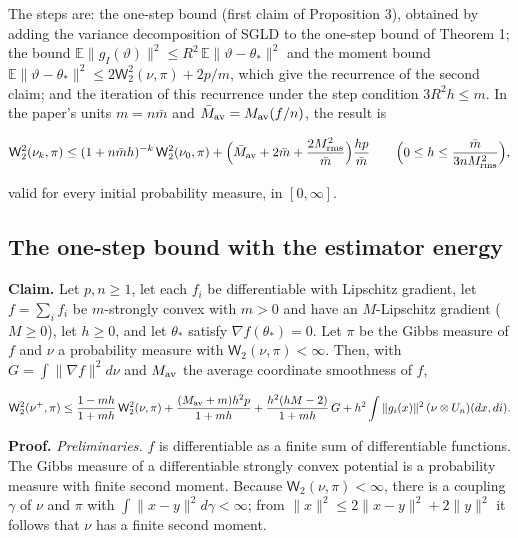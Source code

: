 \documentclass[11pt,a4paper]{report}
\begin{document}
The steps are: the one-step bound (first claim of Proposition 3), obtained by adding the variance decomposition of SGLD to the one-step bound of Theorem 1; the bound \(\mathbb E\|g_I(\vartheta)\|^2\le R^2\,\mathbb E\|\vartheta-\theta_*\|^2\) and the moment bound \(\mathbb E\|\vartheta-\theta_*\|^2\le2\mathsf W_2^2(\nu,\pi)+2p/m\), which give the recurrence of the second claim; and the iteration of this recurrence under the step condition \(3R^2h\le m\). In the paper's units \(m=n\bar m\) and \(\bar M_{\rm av}=M_{\rm av}(f/n)\), the result is


\[\mathsf W_2^2(\nu_k,\pi)\le(1+n\bar mh)^{-k}\,\mathsf W_2^2(\nu_0,\pi)+\Bigl(\bar M_{\rm av}+2\bar m+\frac{2M_{\rm rms}^2}{\bar m}\Bigr)\frac{hp}{\bar m}\qquad\Bigl(0\le h\le\frac{\bar m}{3nM_{\rm rms}^2}\Bigr),\]


valid for every initial probability measure, in \([0,\infty]\).

\subsection{\texorpdfstring{The one-step bound with the estimator energy}{The one-step bound with the estimator energy}}
\label{report-step-AverageLMC-SGLDTheorem-lean-1}


\textbf{Claim.} Let \(p,n\ge1\), let each \(f_i\) be differentiable with Lipschitz gradient, let \(f=\sum_if_i\) be \(m\)-strongly convex with \(m>0\) and have an \(M\)-Lipschitz gradient (\(M\ge0\)), let \(h\ge0\), and let \(\theta_*\) satisfy \(\nabla f(\theta_*)=0\). Let \(\pi\) be the Gibbs measure of \(f\) and \(\nu\) a probability measure with \(\mathsf W_2(\nu,\pi)<\infty\). Then, with \(G=\int\|\nabla f\|^2d\nu\) and \(M_{\rm av}\) the average coordinate smoothness of \(f\),


\[\mathsf W_2^2(\nu^+,\pi)\le\frac{1-mh}{1+mh}\,\mathsf W_2^2(\nu,\pi)+\frac{(M_{\rm av}+m)h^2p}{1+mh}+\frac{h^2(hM-2)}{1+mh}\,G+h^2\int\|g_i(x)\|^2\,(\nu\otimes U_n)(dx,di).\]


\textbf{Proof.} \emph{Preliminaries.} \(f\) is differentiable as a finite sum of differentiable functions. The Gibbs measure of a differentiable strongly convex potential is a probability measure with finite second moment. Because \(\mathsf W_2(\nu,\pi)<\infty\), there is a coupling \(\gamma\) of \(\nu\) and \(\pi\) with \(\int\|x-y\|^2d\gamma<\infty\); from \(\|x\|^2\le2\|x-y\|^2+2\|y\|^2\) it follows that \(\nu\) has a finite second moment.
\end{document}
